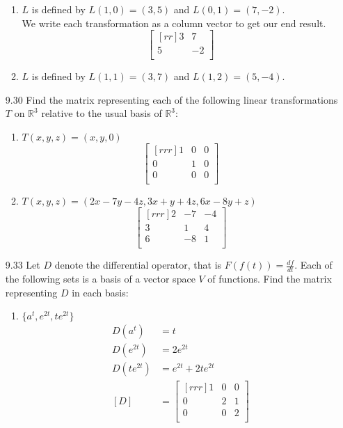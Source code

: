 \documentclass[12pt]{article}
\theoremstyle{definition}
\theoremstyle{plain}
\begin{document}
\begin{enumerate}
\begin{enumerate}
	\item $L$ is defined by $L(1,0)=(3,5)$ and $L(0,1)=(7,-2)$.\\
		We write each transformation as a column vector to get our end result.
		\[ \begin{bmatrix}[rr]3&7\\5&-2\\\end{bmatrix} \]
	\item $L$ is defined by $L(1,1)=(3,7)$ and $L(1,2)=(5,-4)$.\\
		
	\end{enumerate}
\item[9.30]Find the matrix representing each of the following linear transformations $T$ on $\mathbb{R}^3$ relative to the usual basis of $\mathbb{R}^3$:
	\begin{enumerate}
	\item $T(x,y,z)=(x,y,0)$
		\[ \begin{bmatrix}[rrr]1&0&0\\0&1&0\\0&0&0\\\end{bmatrix} \]
	\item $T(x,y,z)=(2x-7y-4z,3x+y+4z,6x-8y+z)$
		\[ \begin{bmatrix}[rrr]2&-7&-4\\3&1&4\\6&-8&1\\\end{bmatrix} \]
	\end{enumerate}
\item[9.33]Let $D$ denote the differential operator, that is $F(f(t))=\frac{df}{dt}$. Each of the following sets is a basis of a vector space $V$ of functions. Find the matrix representing $D$ in each basis:
	\begin{enumerate}
	\item $\{a^t,e^{2t},te^{2t}\}$
		\begin{align*}
		D(a^t)&=t\\
		D(e^{2t})&=2e^{2t}\\
		D(te^{2t})&=e^{2t}+2te^{2t}\\
		[D] &= \begin{bmatrix}[rrr]1&0&0\\0&2&1\\0&0&2\\\end{bmatrix}
		\end{align*}

\end{enumerate}
\end{enumerate}
\end{document}
